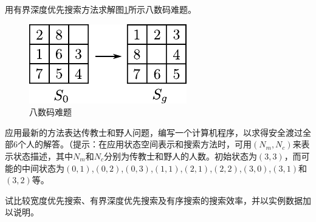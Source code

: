 \begin{question}
用有界深度优先搜索方法求解图\ref{Fig:8-code}所示八数码难题。
	\begin{figure}[h]
		\centering
		\includegraphics{figures/ques-3.7.pdf}
		\caption{八数码难题} \label{Fig:8-code}
	\end{figure}
\end{question}
\begin{solution}
\end{solution}

\begin{question}
应用最新的方法表达传教士和野人问题，编写一个计算机程序，以求得安全渡过全部$6$个人的解答。（提示：在应用状态空间表示和搜索方法时，可用$(N_m,N_c)$来表示状态描述，其中$N_m$和$N_c$分别为传教士和野人的人数。初始状态为$(3,3)$，而可能的中间状态为$(0,1)$,$(0,2)$,$(0,3)$,$(1,1)$,$(2,1)$,$(2,2)$,$(3,0)$,$(3,1)$和$(3,2)$等。
\end{question}
\begin{solution}
\end{solution}

\begin{question}
试比较宽度优先搜索、有界深度优先搜索及有序搜索的搜索效率，并以实例数据加以说明。
\end{question}
\begin{solution}
\end{solution}

